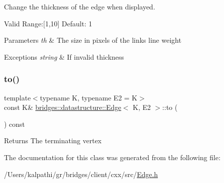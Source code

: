 Change the thickness of the edge when displayed. 

Valid Range\+:\mbox{[}1,10\mbox{]} Default\+: 1


\begin{DoxyParams}{Parameters}
{\em th} & The size in pixels of the link\textquotesingle{}s line weight \\
\hline
\end{DoxyParams}

\begin{DoxyExceptions}{Exceptions}
{\em string} & If invalid thickness \\
\hline
\end{DoxyExceptions}
\mbox{\label{classbridges_1_1datastructure_1_1_edge_a2cece2762a29e3fc18859e0c725eee82}} 
\subsubsection{\texorpdfstring{to()}{to()}}
{\footnotesize\ttfamily template$<$typename K, typename E2 = K$>$ \\
const K\& \mbox{\hyperlink{classbridges_1_1datastructure_1_1_edge}{bridges\+::datastructure\+::\+Edge}}$<$ K, E2 $>$\+::to (\begin{DoxyParamCaption}{ }\end{DoxyParamCaption}) const\hspace{0.3cm}{\ttfamily [inline]}}

\begin{DoxyReturn}{Returns}
The terminating vertex 
\end{DoxyReturn}


The documentation for this class was generated from the following file\+:\begin{DoxyCompactItemize}
\item 
/\+Users/kalpathi/gr/bridges/client/cxx/src/\mbox{\hyperlink{_edge_8h}{Edge.\+h}}\end{DoxyCompactItemize}

